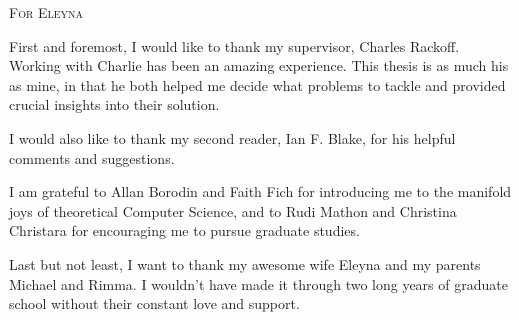 \begin{preliminary}
\begin{abstract}
\end{abstract}


\begin{dedication}
\vspace*{13.5pc}
\centering
\textsc{For Eleyna}
\end{dedication}

\newpage

\begin{acknowledgements}
First and foremost, I would like to thank my supervisor, Charles Rackoff.
Working with Charlie has been an amazing experience.  This thesis is as much
his as mine, in that he both helped me decide what problems to tackle and
provided crucial insights into their solution. 

\medskip\noindent
I would also like to thank my second reader, Ian F. Blake, for his helpful
comments and suggestions.

\medskip\noindent
I am grateful to Allan Borodin and Faith Fich for introducing me to
the manifold joys of theoretical Computer Science, and to Rudi Mathon and
Christina Christara for encouraging me to pursue graduate studies.

\medskip\noindent
Last but not least, I want to thank my awesome wife Eleyna and my parents
Michael and Rimma. I wouldn't have made it through two long years of graduate
school without their constant love and support.

\end{acknowledgements}

\tableofcontents




\end{preliminary}

